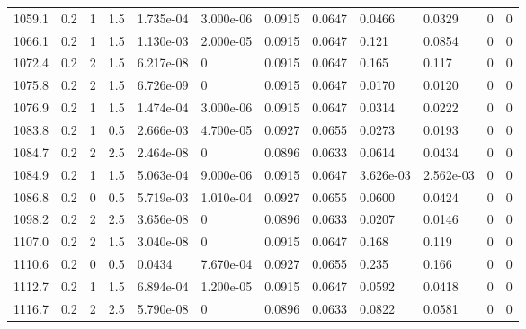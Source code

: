 \documentclass[preview]{standalone}
\begin{document}
{{{{{{\begin{tabular}{L{1.2cm}C{1.2cm} C{0.3cm}C{0.5cm} C{1.4cm}C{1.4cm} C{1.4cm}C{1.4cm} C{1.6cm}C{1.6cm} C{1.6cm}C{1.6cm}}
  1059.1  &   0.2  & 1     & 1.5 &  1.735e-04  & 3.000e-06  &  0.0915&   0.0647& 0.0466 & 0.0329   &  0 & 0  \\ 
  1066.1  &   0.2  & 1     & 1.5 &  1.130e-03  & 2.000e-05  &  0.0915&   0.0647& 0.121 & 0.0854   &  0 & 0  \\ 
  1072.4  &   0.2  & 2     & 1.5 &  6.217e-08  & 0  &  0.0915&   0.0647& 0.165 & 0.117   &  0 & 0  \\ 
  1075.8  &   0.2  & 2     & 1.5 &  6.726e-09  & 0  &  0.0915&   0.0647& 0.0170 & 0.0120   &  0 & 0  \\ 
  1076.9  &   0.2  & 1     & 1.5 &  1.474e-04  & 3.000e-06  &  0.0915&   0.0647& 0.0314 & 0.0222   &  0 & 0  \\ 
  1083.8  &   0.2  & 1     & 0.5 &  2.666e-03  & 4.700e-05  &  0.0927&   0.0655& 0.0273 & 0.0193   &  0 & 0  \\ 
  1084.7  &   0.2  & 2     & 2.5 &  2.464e-08  & 0  &  0.0896&   0.0633& 0.0614 & 0.0434   &  0 & 0  \\ 
  1084.9  &   0.2  & 1     & 1.5 &  5.063e-04  & 9.000e-06  &  0.0915&   0.0647& 3.626e-03 & 2.562e-03   &  0 & 0  \\ 
  1086.8  &   0.2  & 0     & 0.5 &  5.719e-03  & 1.010e-04  &  0.0927&   0.0655& 0.0600 & 0.0424   &  0 & 0  \\ 
  1098.2  &   0.2  & 2     & 2.5 &  3.656e-08  & 0  &  0.0896&   0.0633& 0.0207 & 0.0146   &  0 & 0  \\ 
  1107.0  &   0.2  & 2     & 1.5 &  3.040e-08  & 0  &  0.0915&   0.0647& 0.168 & 0.119   &  0 & 0  \\ 
  1110.6  &   0.2  & 0     & 0.5 &  0.0434  & 7.670e-04  &  0.0927&   0.0655& 0.235 & 0.166   &  0 & 0  \\ 
  1112.7  &   0.2  & 1     & 1.5 &  6.894e-04  & 1.200e-05  &  0.0915&   0.0647& 0.0592 & 0.0418   &  0 & 0  \\ 
  1116.7  &   0.2  & 2     & 2.5 &  5.790e-08  & 0  &  0.0896&   0.0633& 0.0822 & 0.0581   &  0 & 0  \\ 
\hline 
\end{tabular} 

}}}}}}
\end{document}
